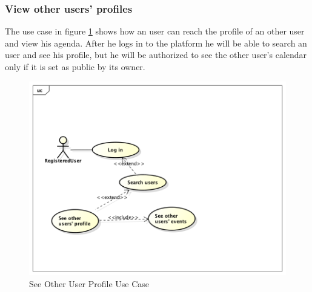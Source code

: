 \subsubsection{View other users' profiles}
The use case in figure \ref{fig:otherprofileusecase} shows how an user can reach the profile of an other user and view his agenda. After he logs in to the platform he will be able to search an user and see his profile, but he will be authorized to see the other user's calendar only if it is set as public by its owner.   
 \begin{center}
 \begin{figure}[H]
    \includegraphics[width=1\textwidth]{../UMLDiagram/use_case/ViewOtherProfiles/UseCaseDiagram0.png}
    \caption{See Other User Profile Use Case}
     \label{fig:otherprofileusecase}
     \end{figure}
   \end{center}  
